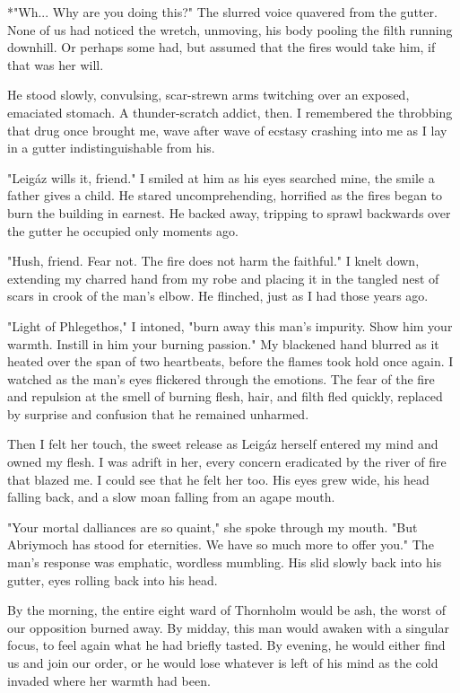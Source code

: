 *"Wh... Why are you doing this?"
 The slurred voice quavered from the gutter.
 None of us had noticed the wretch, unmoving, his body pooling the filth running downhill.
 Or perhaps some had, but assumed that the fires would take him, if that was her will.

 He stood slowly, convulsing, scar-strewn arms twitching over an exposed, emaciated stomach.
 A thunder-scratch addict, then.
 I remembered the throbbing that drug once brought me, wave after wave of ecstasy crashing into me
  as I lay in a gutter indistinguishable from his.

"Leigáz wills it, friend."
 I smiled at him as his eyes searched mine, the smile a father gives a child.
 He stared uncomprehending, horrified as the fires began to burn the building in earnest.
 He backed away, tripping to sprawl backwards over the gutter he occupied only moments ago.

"Hush, friend.
 Fear not.
 The fire does not harm the faithful."
 I knelt down, extending my charred hand from my robe and placing it in the tangled nest of scars
  in crook of the man's elbow.
 He flinched, just as I had those years ago.

"Light of Phlegethos," I intoned, "burn away this man's impurity.
 Show him your warmth.
 Instill in him your burning passion."
 My blackened hand blurred as it heated over the span of two heartbeats,
  before the flames took hold once again.
 I watched as the man's eyes flickered through the emotions.
 The fear of the fire and repulsion at the smell of burning flesh, hair, and filth fled quickly,
  replaced by surprise and confusion that he remained unharmed.

 Then I felt her touch, the sweet release as Leigáz herself entered my mind and owned my flesh.
 I was adrift in her, every concern eradicated by the river of fire that blazed me.
 I could see that he felt her too.
 His eyes grew wide, his head falling back, and a slow moan falling from an agape mouth.

"Your mortal dalliances are so quaint," she spoke through my mouth.
"But Abriymoch has stood for eternities.
 We have so much more to offer you."
 The man's response was emphatic, wordless mumbling.
 His slid slowly back into his gutter, eyes rolling back into his head.

By the morning, the entire eight ward of Thornholm would be ash, the worst of our opposition burned away.
By midday, this man would awaken with a singular focus, to feel again what he had briefly tasted.
By evening, he would either find us and join our order,
 or he would lose whatever is left of his mind as the cold invaded where her warmth had been.

